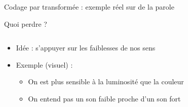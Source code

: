 \documentclass[9pt, aspectratio=169]{beamer}
\begin{document}
\begin{frame}{Codage par transformée : exemple réel sur de la parole} %



\end{frame}



\begin{frame}{Quoi perdre ?} %
\begin{columns}
   \begin{column}{0.6\textwidth}
	
  \begin{itemize}
  	\item Idée : s'appuyer sur les faiblesses de nos sens
  	\item Exemple (visuel) :
  	\begin{itemize}
      \item On est plus sensible à la luminosité que la couleur
      \item On entend pas un son faible proche d'un son fort  	
  	\end{itemize}

  \end{itemize}
   \end{column}
   \begin{column}{0.39\textwidth}
		
   \end{column}
\end{columns}
\end{frame}
\end{document}

